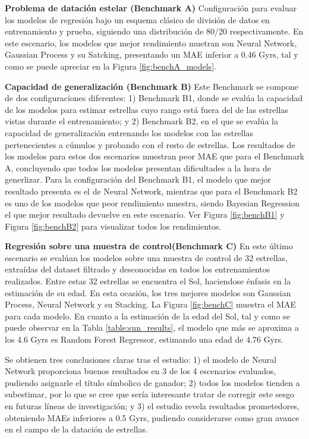 \textbf{Problema de datación estelar (Benchmark A)} {} Configuración para evaluar los modelos de regresión bajo un esquema clásico de división de datos en entrenamiento y prueba, siguiendo una distribución de 80/20 respectivamente. En este escenario, los modelos que mejor rendimiento muetran son Neural Network, Gaussian Process y su Satcking, presentando un MAE inferior a 0.46 Gyrs, tal y como se puede apreciar en la Figura \ref{fig:benchA_models}.

\vspace{0.25cm}

\textbf{Capacidad de generalización (Benchmark B)} {} Este Benchmark se compone de dos configuraciones diferentes: 1) Benchmark B1, donde se evalúa la capacidad de los modelos para estimar estrellas cuyo rango está fuera del de las estrellas vistas durante el entrenamiento; y 2) Benchmark B2, en el que se evalúa la capacidad de generalización entrenando los modelos con las estrellas pertenecientes a cúmulos y probando con el resto de estrellas. Los resultados de los modelos para estos dos escenarios muestran peor MAE que para el Benchmark A, concluyendo que todos los modelos presentan dificultades a la hora de generlizar. Para la configuración del Benchmark B1, el modelo que mejor resultado presenta es el de Neural Network, mientras que para el Benchmark B2 es uno de los modelos que peor rendimiento muestra, siendo Bayesian Regression el que mejor resultado devuelve en este escenario. Ver Figura \ref{fig:benchB1} y Figura \ref{fig:benchB2} para visualizar todos los rendimientos.

\vspace{0.25cm}

\textbf{Regresión sobre una muestra de control(Benchmark C)} {}  En este último escenario se evalúan los modelos sobre una muestra de control de 32 estrellas, extraídas del dataset filtrado y desconocidas en todos los entrenamientos realizados. Entre estas 32 estrellas se encuentra el Sol, haciendose énfasis en la estimación de su edad. En esta ocasión, los tres mejores modelos son Gaussian Process, Neural Network y su Stacking. La Figura \ref{fig:benchC} muestra el MAE para cada modelo. En cuanto a la estimación de la edad del Sol, tal y como se puede observar en la Tabla \ref{table:sun_results}, el modelo que más se aproxima a los 4.6 Gyrs es Random Forest Regressor, estimando una edad de 4.76 Gyrs.

\vspace{0.5cm}

Se obtienen tres conclusiones claras tras el estudio: 1) el modelo de Neural Network proporciona buenos resultados en 3 de los 4 escenarios evaluados, pudiendo asignarle el título símbolico de ganador; 2) todos los modelos tienden a subestimar, por lo que se cree que sería interesante tratar de corregir este sesgo en futuras líneas de investigación; y 3) el estudio revela resultados prometedores, obteniendo MAEs inferiores a 0.5 Gyrs, pudiendo considerarse como gran avance en el campo de la datación de estrellas.

